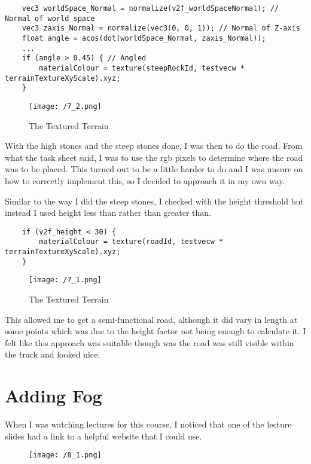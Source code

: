 \documentclass[11pt, oneside, a4paper]{article}
\begin{document}
\begin{lstlisting}
    vec3 worldSpace_Normal = normalize(v2f_worldSpaceNormal); // Normal of world space
    vec3 zaxis_Normal = normalize(vec3(0, 0, 1)); // Normal of Z-axis
    float angle = acos(dot(worldSpace_Normal, zaxis_Normal));
    ...
    if (angle > 0.45) { // Angled
        materialColour = texture(steepRockId, testvecw * terrainTextureXyScale).xyz;
    }
\end{lstlisting}

\newpage
\begin{figure}[!ht]
	\centerline{\texttt{[image: /7\_2.png]}}
	\caption{The Textured Terrain}
	\label{fig:figure5}
\end{figure}

With the high stones and the steep stones done, I was then to do the road. From what the task sheet said, I was to use the rgb pixels to determine where the road was to be placed. This turned out to be a little harder to do and I was unsure on how to correctly implement this, so I decided to approach it in my own way.

Similar to the way I did the steep stones, I checked with the height threshold but instead I used height less than rather than greater than. 

\begin{lstlisting}
    if (v2f_height < 30) {
        materialColour = texture(roadId, testvecw * terrainTextureXyScale).xyz;
    } 
\end{lstlisting}

\begin{figure}[!ht]
	\centerline{\texttt{[image: /7\_1.png]}}
	\caption{The Textured Terrain}
	\label{fig:figure5}
\end{figure}
This allowed me to get a semi-functional road, although it did vary in length at some points which was due to the height factor not being enough to calculate it. I felt like this approach was suitable though was the road was still visible within the track and looked nice.

\newpage
\section{Adding Fog}
When I was watching lectures for this course, I noticed that one of the lecture slides had a link to a helpful website that I could use. 

\begin{figure}[!ht]
	\centerline{\texttt{[image: /8\_1.png]}}
	\label{fig:figure10}
\end{figure}
\end{document}
